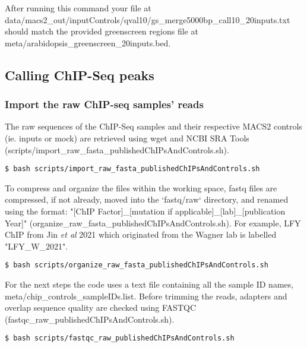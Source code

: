 \documentclass{article}
\begin{document}
\begin{sloppypar}
After running this command your file at {\selectfont data/macs2\_out/inputControls/qval10/gs\_merge5000bp\_call10\_20inputs.txt} should match the provided greenscreen regions file at {\selectfont meta/arabidopsis\_greenscreen\_20inputs.bed}.

\subsection{Calling ChIP-Seq peaks}
\subsubsection{Import the raw ChIP-seq samples' reads}
The raw sequences of the ChIP-Seq samples \cite{Zhu2020,Jin2021,Collani2019,Moyroud2011,Romera2020,Sayou2016} and their respective MACS2 controls (ie. inputs or mock) are retrieved using wget and NCBI SRA Tools ({\selectfont scripts/import\_raw\_fasta\_publishedChIPsAndControls.sh}). 

\begin{verbatim}
$ bash scripts/import_raw_fasta_publishedChIPsAndControls.sh
\end{verbatim}

To compress and organize the files within the working space, fastq files are compressed, if not already, moved into the `fastq/raw` directory, and renamed using the format: "[ChIP Factor]\_[mutation if applicable]\_[lab]\_[publication Year]" ({\selectfont organize\_raw\_fasta\_publishedChIPsAndControls.sh}). For example, LFY ChIP from Jin \emph{et al} 2021 which originated from the Wagner lab is labelled "LFY\_W\_2021". 

\begin{verbatim}
$ bash scripts/organize_raw_fasta_publishedChIPsAndControls.sh
\end{verbatim}

For the next steps the code uses a text file containing all the sample ID names, {\selectfont meta/chip\_controls\_sampleIDs.list}. Before trimming the reads, adapters and overlap sequence quality are checked using FASTQC ({\selectfont fastqc\_raw\_publishedChIPsAndControls.sh}).

\begin{verbatim}
$ bash scripts/fastqc_raw_publishedChIPsAndControls.sh
\end{verbatim}


\end{sloppypar}
\end{document}

